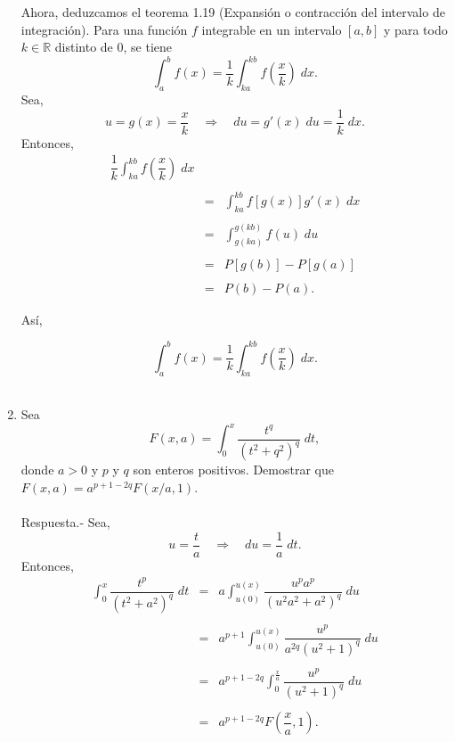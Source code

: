 \begin{enumerate}[\bfseries 1.]
	Ahora, deduzcamos el teorema 1.19 (Expansión o contracción del intervalo de integración). Para una función $f$ integrable en un intervalo $[a,b]$ y para todo $k\in \mathbb{R}$ distinto de $0$, se tiene
	$$\int_a^b f(x)=\dfrac{1}{k}\int_{ka}^{kb}f\left(\dfrac{x}{k}\right)\; dx.$$
	Sea,
	$$u=g(x)=\dfrac{x}{k}\quad \Rightarrow\quad du=g'(x)\; du=\dfrac{1}{k}\; dx.$$
	Entonces,
	$$\begin{array}{rcl}
	    \dfrac{1}{k}\displaystyle\int_{ka}^{kb} f\left(\dfrac{x}{k}\right)\; dx\\\\
	    &=& \displaystyle\int_{ka}^{kb} f\left[g(x)\right]g'(x)\; dx\\\\
	    &=&\displaystyle\int_{g(ka)}^{g(kb)} f(u)\; du\\\\
	    &=&P\left[g(b)\right]-P\left[g(a)\right]\\\\
	    &=& P(b)-P(a).
	\end{array}$$

	Así,

	$$\int_a^b f(x)=\dfrac{1}{k}\int_{ka}^{kb}f\left(\dfrac{x}{k}\right)\; dx.$$\\


    \item Sea
    $$F(x,a)=\int_0^x \dfrac{t^q}{(t^2+q^2)^q}\; dt,$$
    donde $a>0$ y $p$ y $q$ son enteros positivos. Demostrar que $F(x,a)=a^{p+1-2q}F(x/a,1)$.\\\\
	Respuesta.-\; Sea,
	$$u=\dfrac{t}{a}\quad \Rightarrow \quad du=\dfrac{1}{a}\; dt.$$
	Entonces,
	$$\begin{array}{rcl}
	    \displaystyle\int_0^x \dfrac{t^p}{(t^2+a^2)^q}\; dt &=&\displaystyle a\int_{u(0)}^{u(x)} \dfrac{u^p a^p}{(u^2a^2+a^2)^q}\; du\\\\
								&=& \displaystyle a^{p+1} \int_{u(0)}^{u(x)}\dfrac{u^p}{a^{2q}(u^2+1)^q}\; du\\\\
								&=&a^{p+1-2q}\displaystyle\int_0^{\frac{x}{a}} \dfrac{u^p}{(u^2+1)^q}\; du\\\\
								&=&a^{p+1-2q} F\left(\dfrac{x}{a},1\right).
	\end{array}$$
	\vspace{.5cm}


\end{enumerate}
